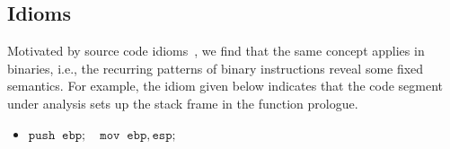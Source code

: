 

\subsection{Idioms} \label{subsec:idiom_ana}
Motivated by source code idioms~\cite{allamanis2014mining}, we find that the same concept applies in binaries, i.e., the recurring patterns of binary instructions reveal some fixed semantics.
For example, the idiom given below indicates that the code segment under analysis sets up the stack frame in the function prologue.
\begin{itemize}
\centering
\itemsep-0.5em
  \item[] $\mathtt{push \;\;ebp; \quad mov \;\; ebp, esp;}$
\end{itemize}

